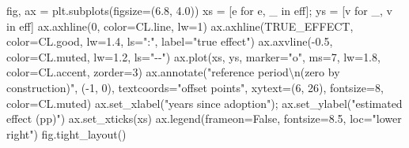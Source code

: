 \documentclass[
  letterpaper,
  10pt,
  twoside,
  openright,
  numbers=noenddot,
  chapterprefix=true]{scrbook}
\newenvironment{Shaded}{}{}
\newcommand{\CharTok}[1]{\textcolor[rgb]{0.01,0.18,0.38}{#1}}
\newcommand{\ControlFlowTok}[1]{\textcolor[rgb]{0.84,0.23,0.29}{#1}}
\newcommand{\DecValTok}[1]{\textcolor[rgb]{0.00,0.36,0.77}{#1}}
\newcommand{\FloatTok}[1]{\textcolor[rgb]{0.00,0.36,0.77}{#1}}
\newcommand{\KeywordTok}[1]{\textcolor[rgb]{0.84,0.23,0.29}{#1}}
\newcommand{\NormalTok}[1]{\textcolor[rgb]{0.14,0.16,0.18}{#1}}
\newcommand{\OperatorTok}[1]{\textcolor[rgb]{0.14,0.16,0.18}{#1}}
\newcommand{\StringTok}[1]{\textcolor[rgb]{0.01,0.18,0.38}{#1}}
\newcommand{\VariableTok}[1]{\textcolor[rgb]{0.89,0.38,0.04}{#1}}
\begin{document}
\begin{Shaded}
\begin{Highlighting}[]
\NormalTok{fig, ax }\OperatorTok{=}\NormalTok{ plt.subplots(figsize}\OperatorTok{=}\NormalTok{(}\FloatTok{6.8}\NormalTok{, }\FloatTok{4.0}\NormalTok{))}
\NormalTok{xs }\OperatorTok{=}\NormalTok{ [e }\ControlFlowTok{for}\NormalTok{ e, \_ }\KeywordTok{in}\NormalTok{ eff]}\OperatorTok{;}\NormalTok{ ys }\OperatorTok{=}\NormalTok{ [v }\ControlFlowTok{for}\NormalTok{ \_, v }\KeywordTok{in}\NormalTok{ eff]}
\NormalTok{ax.axhline(}\DecValTok{0}\NormalTok{, color}\OperatorTok{=}\NormalTok{CL.line, lw}\OperatorTok{=}\DecValTok{1}\NormalTok{)}
\NormalTok{ax.axhline(TRUE\_EFFECT, color}\OperatorTok{=}\NormalTok{CL.good, lw}\OperatorTok{=}\FloatTok{1.4}\NormalTok{, ls}\OperatorTok{=}\StringTok{":"}\NormalTok{, label}\OperatorTok{=}\StringTok{"true effect"}\NormalTok{)}
\NormalTok{ax.axvline(}\OperatorTok{{-}}\FloatTok{0.5}\NormalTok{, color}\OperatorTok{=}\NormalTok{CL.muted, lw}\OperatorTok{=}\FloatTok{1.2}\NormalTok{, ls}\OperatorTok{=}\StringTok{"{-}{-}"}\NormalTok{)}
\NormalTok{ax.plot(xs, ys, marker}\OperatorTok{=}\StringTok{"o"}\NormalTok{, ms}\OperatorTok{=}\DecValTok{7}\NormalTok{, lw}\OperatorTok{=}\FloatTok{1.8}\NormalTok{, color}\OperatorTok{=}\NormalTok{CL.accent, zorder}\OperatorTok{=}\DecValTok{3}\NormalTok{)}
\NormalTok{ax.annotate(}\StringTok{"reference period}\CharTok{\textbackslash{}n}\StringTok{(zero by construction)"}\NormalTok{, (}\OperatorTok{{-}}\DecValTok{1}\NormalTok{, }\DecValTok{0}\NormalTok{),}
\NormalTok{            textcoords}\OperatorTok{=}\StringTok{"offset points"}\NormalTok{, xytext}\OperatorTok{=}\NormalTok{(}\DecValTok{6}\NormalTok{, }\DecValTok{26}\NormalTok{), fontsize}\OperatorTok{=}\DecValTok{8}\NormalTok{, color}\OperatorTok{=}\NormalTok{CL.muted)}
\NormalTok{ax.set\_xlabel(}\StringTok{"years since adoption"}\NormalTok{)}\OperatorTok{;}\NormalTok{ ax.set\_ylabel(}\StringTok{"estimated effect (pp)"}\NormalTok{)}
\NormalTok{ax.set\_xticks(xs)}
\NormalTok{ax.legend(frameon}\OperatorTok{=}\VariableTok{False}\NormalTok{, fontsize}\OperatorTok{=}\FloatTok{8.5}\NormalTok{, loc}\OperatorTok{=}\StringTok{"lower right"}\NormalTok{)}
\NormalTok{fig.tight\_layout()}


\end{Highlighting}
\end{Shaded}
\end{document}
